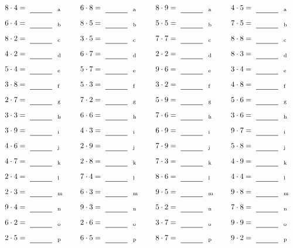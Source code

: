 \documentclass
[
  draft    = true,
  fontsize = 11pt,
  parskip  = half-
]
{scrartcl}
\begin{document}
\par\vfill\par
\begin{align*}
    \pline{8\cdot4}&=\rline{a}
  & \pline{6\cdot8}&=\rline{a}
  & \pline{8\cdot9}&=\rline{a}
  & \pline{4\cdot5}&=\rline{a} \\[1ex]
    \pline{6\cdot4}&=\rline{b}
  & \pline{8\cdot5}&=\rline{b}
  & \pline{5\cdot5}&=\rline{b}
  & \pline{7\cdot5}&=\rline{b} \\[1ex]
    \pline{8\cdot2}&=\rline{c}
  & \pline{3\cdot5}&=\rline{c}
  & \pline{7\cdot7}&=\rline{c}
  & \pline{8\cdot8}&=\rline{c} \\[1ex]
    \pline{4\cdot2}&=\rline{d}
  & \pline{6\cdot7}&=\rline{d}
  & \pline{2\cdot2}&=\rline{d}
  & \pline{8\cdot3}&=\rline{d} \\[1ex]
    \pline{5\cdot4}&=\rline{e}
  & \pline{5\cdot7}&=\rline{e}
  & \pline{9\cdot6}&=\rline{e}
  & \pline{3\cdot4}&=\rline{e} \\[1ex]
    \pline{3\cdot8}&=\rline{f}
  & \pline{5\cdot3}&=\rline{f}
  & \pline{3\cdot2}&=\rline{f}
  & \pline{4\cdot8}&=\rline{f} \\[1ex]
    \pline{2\cdot7}&=\rline{g}
  & \pline{7\cdot2}&=\rline{g}
  & \pline{5\cdot9}&=\rline{g}
  & \pline{5\cdot6}&=\rline{g} \\[1ex]
    \pline{3\cdot3}&=\rline{h}
  & \pline{6\cdot6}&=\rline{h}
  & \pline{7\cdot6}&=\rline{h}
  & \pline{3\cdot6}&=\rline{h} \\[1ex]
    \pline{3\cdot9}&=\rline{i}
  & \pline{4\cdot3}&=\rline{i}
  & \pline{6\cdot9}&=\rline{i}
  & \pline{9\cdot7}&=\rline{i} \\[1ex]
    \pline{4\cdot6}&=\rline{j}
  & \pline{2\cdot9}&=\rline{j}
  & \pline{7\cdot9}&=\rline{j}
  & \pline{5\cdot8}&=\rline{j} \\[1ex]
    \pline{4\cdot7}&=\rline{k}
  & \pline{2\cdot8}&=\rline{k}
  & \pline{7\cdot3}&=\rline{k}
  & \pline{4\cdot9}&=\rline{k} \\[1ex]
    \pline{2\cdot4}&=\rline{l}
  & \pline{7\cdot4}&=\rline{l}
  & \pline{8\cdot6}&=\rline{l}
  & \pline{4\cdot4}&=\rline{l} \\[1ex]
    \pline{2\cdot3}&=\rline{m}
  & \pline{6\cdot3}&=\rline{m}
  & \pline{9\cdot5}&=\rline{m}
  & \pline{9\cdot8}&=\rline{m} \\[1ex]
    \pline{9\cdot4}&=\rline{n}
  & \pline{9\cdot3}&=\rline{n}
  & \pline{5\cdot2}&=\rline{n}
  & \pline{7\cdot8}&=\rline{n} \\[1ex]
    \pline{6\cdot2}&=\rline{o}
  & \pline{2\cdot6}&=\rline{o}
  & \pline{3\cdot7}&=\rline{o}
  & \pline{9\cdot9}&=\rline{o} \\[1ex]
    \pline{2\cdot5}&=\rline{p}
  & \pline{6\cdot5}&=\rline{p}
  & \pline{8\cdot7}&=\rline{p}
  & \pline{9\cdot2}&=\rline{p}
\end{align*}
\end{document}
